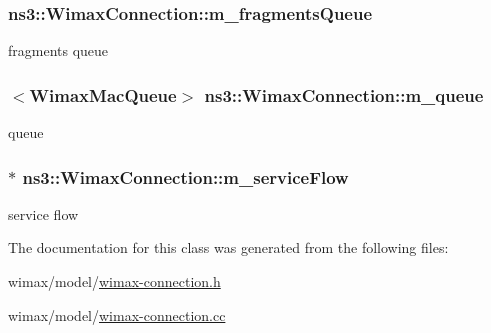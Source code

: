\subsubsection[{\texorpdfstring{m\+\_\+fragments\+Queue}{m_fragmentsQueue}}]{ ns3\+::\+Wimax\+Connection\+::m\+\_\+fragments\+Queue\hspace{0.3cm}{\ttfamily [private]}}\hypertarget{classns3_1_1WimaxConnection_ad3c9008071b97bc660d49c05d7279f95}{}\label{classns3_1_1WimaxConnection_ad3c9008071b97bc660d49c05d7279f95}


fragments queue 

\subsubsection[{\texorpdfstring{m\+\_\+queue}{m_queue}}]{$<${\bf Wimax\+Mac\+Queue}$>$ ns3\+::\+Wimax\+Connection\+::m\+\_\+queue\hspace{0.3cm}{\ttfamily [private]}}\hypertarget{classns3_1_1WimaxConnection_a96fa093e7f190ca65d515206179c9faa}{}\label{classns3_1_1WimaxConnection_a96fa093e7f190ca65d515206179c9faa}


queue 

\subsubsection[{\texorpdfstring{m\+\_\+service\+Flow}{m_serviceFlow}}]{$\ast$ ns3\+::\+Wimax\+Connection\+::m\+\_\+service\+Flow\hspace{0.3cm}{\ttfamily [private]}}\hypertarget{classns3_1_1WimaxConnection_a1f584c9abac19d8efc5f9a34ac5306a8}{}\label{classns3_1_1WimaxConnection_a1f584c9abac19d8efc5f9a34ac5306a8}


service flow 



The documentation for this class was generated from the following files\+:\begin{DoxyCompactItemize}
\item 
wimax/model/\hyperlink{wimax-connection_8h}{wimax-\/connection.\+h}\item 
wimax/model/\hyperlink{wimax-connection_8cc}{wimax-\/connection.\+cc}\end{DoxyCompactItemize}
